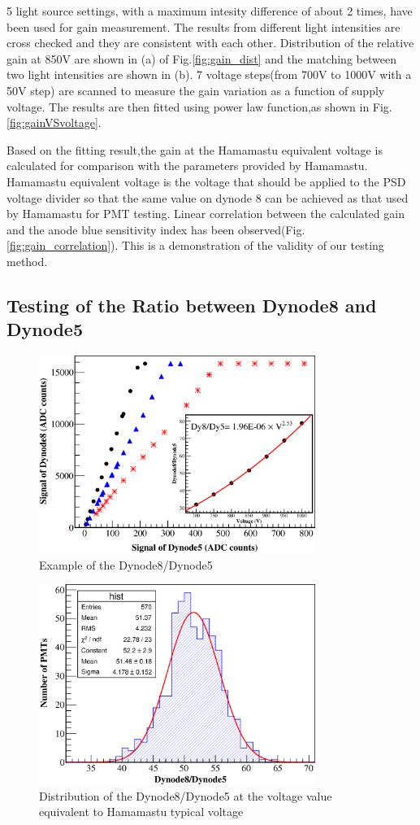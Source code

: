 \documentclass[5p, times]{elsarticle}
\begin{document}
5 light source settings, with a maximum intesity difference of about 2 times, have been used for gain measurement.
The results from different light intensities are cross checked and they are consistent with each other.
Distribution of the relative gain at 850V are shown in (a) of Fig.\ref{fig:gain_dist} and the matching between two light intensities are shown in (b).
7 voltage steps(from 700V to 1000V with a 50V step) are scanned to measure the gain variation as a function of supply voltage.
The results are then fitted using power law function,as shown in Fig.\ref{fig:gainVSvoltage}.

Based on the fitting result,the gain at the Hamamastu equivalent voltage is calculated for comparison with the parameters provided by Hamamastu.
Hamamastu equivalent voltage is the voltage that should be applied to the PSD voltage divider so that the same value on dynode 8 can be achieved as that used by Hamamastu for PMT testing.
Linear correlation between the calculated gain and the anode blue sensitivity index has been observed(Fig.\ref{fig:gain_correlation}).
This is a demonstration of the validity of our testing method.

\subsection{Testing of the Ratio between Dynode8 and Dynode5}
\label{sec:psd_dy58}

\begin{figure}[h]
 \centering
 \includegraphics[width=90mm]{dy58_example}
\caption{Example of the Dynode8/Dynode5}
\label{fig:dy58_example}
\end{figure} 

\begin{figure}[h]
 \centering
 \includegraphics[width=90mm]{dy58_dist}
\caption{Distribution of the Dynode8/Dynode5 at the voltage value equivalent to Hamamastu typical voltage}
\label{fig:dy58_dist}
\end{figure} 
\end{document}
